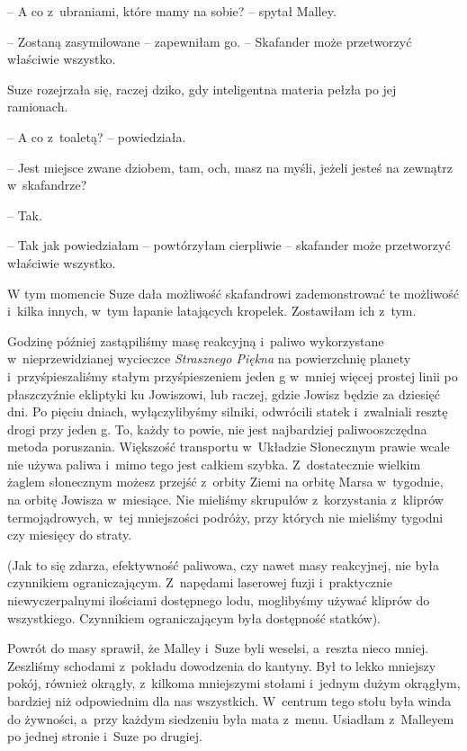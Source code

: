 \documentclass[oneside,polish,11pt,sfheadings]{mwbk}
\begin{document}
-- A co z~ubraniami, które mamy na sobie? -- spytał Malley.

-- Zostaną zasymilowane -- zapewniłam go. -- Skafander może przetworzyć
właściwie wszystko.

Suze rozejrzała się, raczej dziko, gdy inteligentna materia pełzła po
jej ramionach.

-- A co z~toaletą? -- powiedziała.

-- Jest miejsce zwane dziobem, tam, och, masz na myśli, jeżeli jesteś na
zewnątrz w~skafandrze?

-- Tak.

-- Tak jak powiedziałam -- powtórzyłam cierpliwie -- skafander może
przetworzyć właściwie wszystko.

W tym momencie Suze dała możliwość skafandrowi zademonstrować te
możliwość i~kilka innych, w~tym łapanie latających kropelek. Zostawiłam
ich z~tym.

Godzinę później zastąpiliśmy masę reakcyjną i~paliwo wykorzystane w~nieprzewidzianej wycieczce \textit{Strasznego Piękna} na powierzchnię
planety i~przyśpieszaliśmy stałym przyśpieszeniem jeden g w~mniej więcej
prostej linii po płaszczyźnie ekliptyki ku Jowiszowi, lub raczej, gdzie
Jowisz będzie za dziesięć dni. Po pięciu dniach, wyłączylibyśmy silniki,
odwrócili statek i~zwalniali resztę drogi przy jeden g. To, każdy to
powie, nie jest najbardziej paliwooszczędna metoda poruszania. Większość
transportu w~Układzie Słonecznym prawie wcale nie używa paliwa i~mimo
tego jest całkiem szybka. Z~dostatecznie wielkim żaglem słonecznym
możesz przejść z~orbity Ziemi na orbitę Marsa w~tygodnie, na orbitę
Jowisza w~miesiące. Nie mieliśmy skrupułów z~korzystania z~kliprów
termojądrowych, w~tej mniejszości podróży, przy których nie mieliśmy
tygodni czy miesięcy do straty.

(Jak to się zdarza, efektywność paliwowa, czy nawet masy reakcyjnej, nie
była czynnikiem ograniczającym. Z~napędami laserowej fuzji i~praktycznie
niewyczerpalnymi ilościami dostępnego lodu, moglibyśmy używać kliprów
do wszystkiego. Czynnikiem ograniczającym była dostępność statków).

Powrót do masy sprawił, że Malley i~Suze byli weselsi, a~reszta nieco
mniej. Zeszliśmy schodami z~pokładu dowodzenia do kantyny. Był to lekko
mniejszy pokój, również okrągły, z~kilkoma mniejszymi stołami i~jednym
dużym okrągłym, bardziej niż odpowiednim dla nas wszystkich. W~centrum
tego stołu była winda do żywności, a~przy każdym siedzeniu była mata z~menu. Usiadłam z~Malleyem po jednej stronie i~Suze po drugiej.
\end{document}
